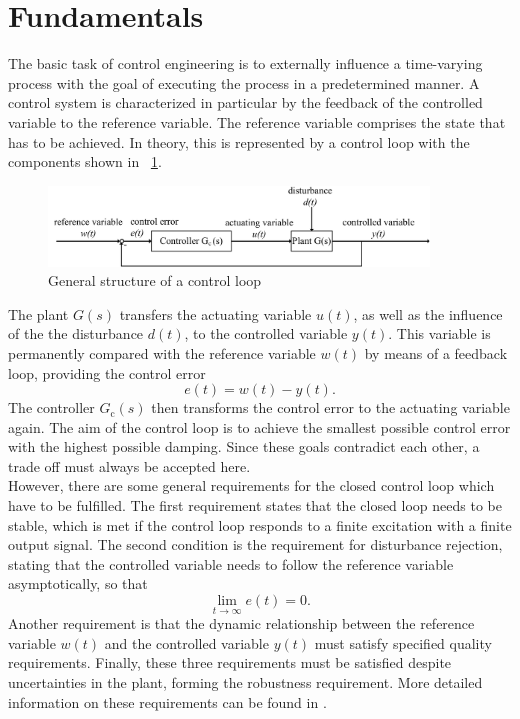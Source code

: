 \section{Fundamentals}
The basic task of control engineering is to externally influence a time-varying process with the goal of executing the process in a predetermined manner. A control system is characterized in particular by the feedback of the controlled variable to the reference variable. The reference variable comprises the state that has to be achieved.
In theory, this is represented by a control loop with the components shown in \figurename~{\ref{fig:control_loop}}.
\begin{figure}
  \centering
  \includegraphics[width=0.9\textwidth]{images/chapt_3/control_loop.pdf}
  \caption[General structure of a control loop]{General structure of a control loop}
  \label{fig:control_loop}
\end{figure}
The plant $G(s)$ transfers the actuating variable $u(t)$, as well as the influence of the the disturbance $d(t)$, to the controlled variable $y(t)$. This variable is permanently compared with the reference variable $w(t)$ by means of a feedback loop, providing the control error
\begin{equation}
  e(t) = w(t) - y(t).
 \label{eq:e_t}
\end{equation}
The controller $G_{\mathrm{c}}(s)$ then transforms the control error to the actuating variable again. The aim of the control loop is to achieve the smallest possible control error with the highest possible damping. Since these goals contradict each other, a trade off must always be accepted here. \cite{Reg_17}
\\However, there are some general requirements for the closed control loop which have to be fulfilled. The first requirement states that the closed loop needs to be stable, which is met if the control loop responds to a finite excitation with a finite output signal. The second condition is the requirement for disturbance rejection, stating that the controlled variable needs to follow the reference variable asymptotically, so that
\begin{equation}
    \lim\limits_{t \rightarrow \infty}{e(t)} = 0.
 \label{eq:lim_e}
\end{equation}
Another requirement is that the dynamic relationship between the reference variable $w(t)$ and the controlled variable $y(t)$ must satisfy specified quality requirements.  Finally, these three requirements must be satisfied despite uncertainties in the plant, forming the robustness requirement. More detailed information on these requirements can be found in \cite{Reg_10}.

